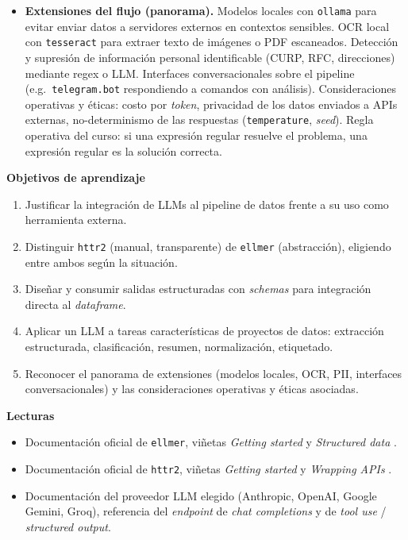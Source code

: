 \documentclass[11pt,letterpaper]{article}
\begin{document}
\begin{itemize}[leftmargin=*, itemsep=2pt]
    \item \textbf{Extensiones del flujo (panorama).} Modelos locales con \texttt{ollama} para evitar enviar datos a servidores externos en contextos sensibles. OCR local con \texttt{tesseract} para extraer texto de imágenes o PDF escaneados. Detección y supresión de información personal identificable (CURP, RFC, direcciones) mediante regex o LLM. Interfaces conversacionales sobre el pipeline (e.g.\ \texttt{telegram.bot} respondiendo a comandos con análisis). Consideraciones operativas y éticas: costo por \textit{token}, privacidad de los datos enviados a APIs externas, no-determinismo de las respuestas (\texttt{temperature}, \textit{seed}). Regla operativa del curso: si una expresión regular resuelve el problema, una expresión regular es la solución correcta.
\end{itemize}

\medskip
\noindent\textbf{Objetivos de aprendizaje}
\begin{enumerate}[leftmargin=*, itemsep=1pt]
    \item Justificar la integración de LLMs al pipeline de datos frente a su uso como herramienta externa.
    \item Distinguir \texttt{httr2} (manual, transparente) de \texttt{ellmer} (abstracción), eligiendo entre ambos según la situación.
    \item Diseñar y consumir salidas estructuradas con \textit{schemas} para integración directa al \textit{dataframe}.
    \item Aplicar un LLM a tareas características de proyectos de datos: extracción estructurada, clasificación, resumen, normalización, etiquetado.
    \item Reconocer el panorama de extensiones (modelos locales, OCR, PII, interfaces conversacionales) y las consideraciones operativas y éticas asociadas.
\end{enumerate}

\medskip
\noindent\textbf{Lecturas}
\begin{itemize}[leftmargin=*, itemsep=1pt]
    \item Documentación oficial de \texttt{ellmer}, viñetas \textit{Getting started} y \textit{Structured data} \cite{wickham-ellmer}.
    \item Documentación oficial de \texttt{httr2}, viñetas \textit{Getting started} y \textit{Wrapping APIs} \cite{wickham-httr2}.
    \item Documentación del proveedor LLM elegido (Anthropic, OpenAI, Google Gemini, Groq), referencia del \textit{endpoint} de \textit{chat completions} y de \textit{tool use} / \textit{structured output}.
\end{itemize}
\end{document}
